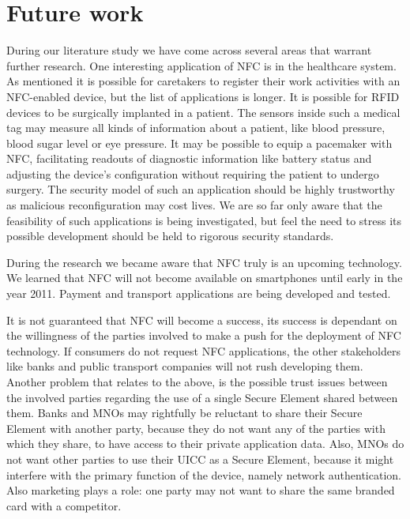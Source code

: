 \section{Future work}
\label{sec:future_work}

During our literature study we have come across several areas that warrant further research.
One interesting application of NFC is in the healthcare system.
As mentioned it is possible for caretakers to register their work activities with an NFC-enabled device, but the list of applications is longer.
It is possible for RFID devices to be surgically implanted in a patient.
The sensors inside such a medical tag may measure all kinds of information about a patient, like blood pressure, blood sugar level or eye pressure.
It may be possible to equip a pacemaker with NFC, facilitating readouts of diagnostic information like battery status and adjusting the device's configuration without requiring the patient to undergo surgery. 
The security model of such an application should be highly trustworthy as malicious reconfiguration may cost lives.
We are so far only aware that the feasibility of such applications is being investigated, but feel the need to stress its possible development should be held to rigorous security standards.

During the research we became aware that NFC truly is an upcoming technology.
We learned that NFC will not become available on smartphones until early in the year 2011.
Payment and transport applications are being developed and tested.

It is not guaranteed that NFC will become a success, its success is dependant on the willingness of the parties involved to make a push for the deployment of NFC technology.
If consumers do not request NFC applications, the other stakeholders like banks and public transport companies will not rush developing them.
Another problem that relates to the above, is the possible trust issues between the involved parties regarding the use of a single Secure Element shared between them.
Banks and MNOs may rightfully be reluctant to share their Secure Element with another party, because they do not want any of the parties with which they share, to have access to their private application data.
Also, MNOs do not want other parties to use their UICC as a Secure Element, because it might interfere with the primary function of the device, namely network authentication.
Also marketing plays a role: one party may not want to share the same branded card with a competitor.

